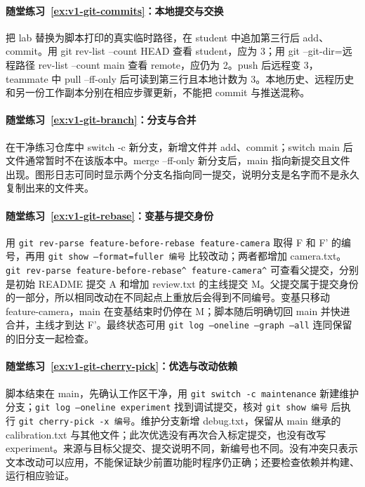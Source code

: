 \paragraph*{随堂练习~\ref{ex:v1-git-commits}：本地提交与交换}
\begin{solution}
把 lab 替换为脚本打印的真实临时路径，在 student 中追加第三行后 add、commit。用 git rev-list --count HEAD 查看 student，应为 3；用 git --git-dir=远程路径 rev-list --count main 查看 remote，应仍为 2。push 后远程变 3，teammate 中 pull --ff-only 后可读到第三行且本地计数为 3。本地历史、远程历史和另一份工作副本分别在相应步骤更新，不能把 commit 与推送混称。
\end{solution}

\paragraph*{随堂练习~\ref{ex:v1-git-branch}：分支与合并}
\begin{solution}
在干净练习仓库中 switch -c 新分支，新增文件并 add、commit；switch main 后文件通常暂时不在该版本中。merge --ff-only 新分支后，main 指向新提交且文件出现。图形日志可同时显示两个分支名指向同一提交，说明分支是名字而不是永久复制出来的文件夹。
\end{solution}
\paragraph*{随堂练习~\ref{ex:v1-git-rebase}：变基与提交身份}
\begin{solution}
用 \texttt{git rev-parse feature-before-rebase feature-camera} 取得 F 和 F' 的编号，再用 \texttt{git show --format=fuller 编号} 比较改动；两者都增加 camera.txt。\texttt{git rev-parse feature-before-rebase\textasciicircum{} feature-camera\textasciicircum{}} 可查看父提交，分别是初始 README 提交 A 和增加 review.txt 的主线提交 M。父提交属于提交身份的一部分，所以相同改动在不同起点上重放后会得到不同编号。变基只移动 feature-camera，main 在变基结束时仍停在 M；脚本随后明确切回 main 并快进合并，主线才到达 F'。最终状态可用 \texttt{git log --oneline --graph --all} 连同保留的旧分支一起检查。
\end{solution}
\paragraph*{随堂练习~\ref{ex:v1-git-cherry-pick}：优选与改动依赖}
\begin{solution}
脚本结束在 main，先确认工作区干净，用 \texttt{git switch -c maintenance} 新建维护分支；\texttt{git log --oneline experiment} 找到调试提交，核对 \texttt{git show 编号} 后执行 \texttt{git cherry-pick -x 编号}。维护分支新增 debug.txt，保留从 main 继承的 calibration.txt 与其他文件；此次优选没有再次合入标定提交，也没有改写 experiment。来源与目标父提交、提交说明不同，新编号也不同。没有冲突只表示文本改动可以应用，不能保证缺少前置功能时程序仍正确；还要检查依赖并构建、运行相应验证。
\end{solution}
